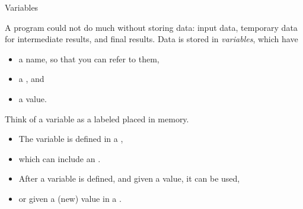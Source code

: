 \begin{comment}

\begin{exercise}
  \label{ex:cout-what}
  Experiment with the \lstinline{cout} statement. Replace the string by a
  number or a mathematical expression. Can you guess how to print more
  than one thing, for instance:
  \begin{itemize}
  \item the string \n{One third is}, and
  \item the result of the computation~$1/3$,     
  \end{itemize}
  with the same \lstinline{cout} statement?
\end{exercise}

\begin{block}{Return statement}
  \begin{itemize}
  \item The language standard says that \lstinline{main} has to be of type
    \lstinline{int}; the \indextermbus{return}{statement} returns an int.
  \item Compilers are fairly tolerant of deviations from this.
  \item Usual interpretation: returning zero means success; anything else failure;
  \item This \indextermbus{return}{code} can be detected by the
    \emph{shell}\index{shell!inspect return code}
  \end{itemize}
  \snippetwithoutput{returnone}{basic}{return}
\end{block}

\end{comment}

 {Variables}
\label{sec:variables}

A program could not do much without storing data: input data,
temporary data for intermediate results, and final results.
Data is stored in \emph{variables},  which have
\begin{itemize}
\item a name, so that you can refer to them,
\item a , and
\item a value.
\end{itemize}
Think of a variable as a labeled placed in memory.
\begin{itemize}
\item The variable is defined in a
  ,
\item which can include an .
\item After a variable is defined, and given a value, it can be used,
\item or given a (new) value in a .
\end{itemize}

